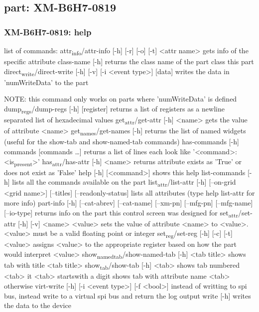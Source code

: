 \documentclass[11pt]{article}
\begin{document}
\subsection{part: XM-B6H7-0819}
\label{sec:org2e8151f}
\subsubsection{XM-B6H7-0819: help}
\label{sec:org9d31f11}
list of commands:
  attr\textsubscript{info}/attr-info [-h] [-r] [-o] [-t] <attr name>
    gets info of the specific attribute
  class-name [-h]
    returns the class name of the part class this part
  direct\textsubscript{write}/direct-write [-h] [-v] [-i <event type>] [data]
    writes the data in 'numWriteData' to the part

  NOTE: this command only works on parts where 'numWriteData' is defined
dump\textsubscript{regs}/dump-regs [-h] [register]
  returns a list of registers as a newline separated list of hexadecimal values
get\textsubscript{attr}/get-attr [-h] <name>
  gets the value of attribute <name>
get\textsubscript{names}/get-names [-h]
  returns the list of named widgets (useful for the show-tab and show-named-tab commands)
has-commands [-h] commands [commands \ldots{}]
  returns a list of lines each look like '<command>: <is\textsubscript{present}>'
has\textsubscript{attr}/has-attr [-h] <name>
  returns attribute exists as 'True' or does not exist as 'False'
help [-h] [<command>]
  shows this help
list-commands [-h]
  lists all the commands available on the part
list\textsubscript{attr}/list-attr [-h] [--on-grid <grid name>] [--titles] [--readonly-status]
  lists all attributes (type help list-attr for more info)
part-info  [-h] [--cat-abrev] [--cat-name] [--xm-pn] [--mfg-pn] [--mfg-name]
	[--io-type]
  returns info on the part this control screen was designed for
set\textsubscript{attr}/set-attr [-h] [-v] <name> <value>
  sets the value of attribute <name> to <value>.
  <value> must be a valid floating point or integer
set\textsubscript{reg}/set-reg [-h] [-c] [-t] <value>
  assigns <value> to the appropriate register based on how the part would interpret <value>
show\textsubscript{named}\textsubscript{tab}/show-named-tab [-h] <tab title>
  shows tab with title <tab title>
show\textsubscript{tab}/show-tab [-h] <tab>
  shows tab numbered <tab> it <tab> startswith a digit
  shows tab with attribute name <tab> otherwise
virt-write [-h] [-i <event type>] [-f <bool>]
  instead of writting to spi bus, instead write to a virtual spi bus
  and return the log output
write [-h]
  writes the data to the device
\end{document}
